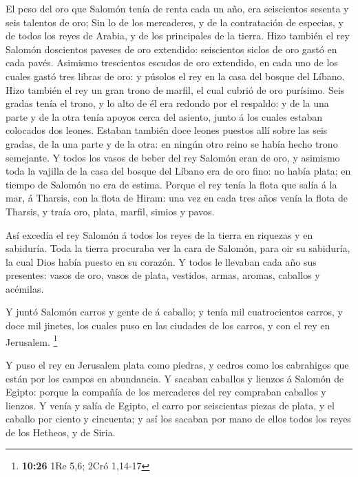  El peso del oro que Salomón tenía de renta cada un año,
era seiscientos sesenta y seis talentos de oro;  Sin lo de
los mercaderes, y de la contratación de especias, y de todos los reyes
de Arabia, y de los principales de la tierra.  Hizo también
el rey Salomón doscientos paveses de oro extendido: seiscientos siclos
de oro gastó en cada pavés.  Asimismo trescientos escudos
de oro extendido, en cada uno de los cuales gastó tres libras de oro: y
púsolos el rey en la casa del bosque del Líbano.  Hizo
también el rey un gran trono de marfil, el cual cubrió de oro purísimo.
 Seis gradas tenía el trono, y lo alto de él era redondo
por el respaldo: y de la una parte y de la otra tenía apoyos cerca del
asiento, junto á los cuales estaban colocados dos leones. 
Estaban también doce leones puestos allí sobre las seis gradas, de la
una parte y de la otra: en ningún otro reino se había hecho trono
semejante.  Y todos los vasos de beber del rey Salomón eran
de oro, y asimismo toda la vajilla de la casa del bosque del Líbano era
de oro fino: no había plata; en tiempo de Salomón no era de estima.
 Porque el rey tenía la flota que salía á la mar, á
Tharsis, con la flota de Hiram: una vez en cada tres años venía la flota
de Tharsis, y traía oro, plata, marfil, simios y pavos.

 Así excedía el rey Salomón á todos los reyes de la tierra
en riquezas y en sabiduría.  Toda la tierra procuraba ver
la cara de Salomón, para oir su sabiduría, la cual Dios había puesto en
su corazón.  Y todos le llevaban cada año sus presentes:
vasos de oro, vasos de plata, vestidos, armas, aromas, caballos y
acémilas.

 Y juntó Salomón carros y gente de á caballo; y tenía mil
cuatrocientos carros, y doce mil jinetes, los cuales puso en las
ciudades de los carros, y con el rey en Jerusalem. \footnote{\textbf{10:26}
  1Re 5,6; 2Cró 1,14-17}

 Y puso el rey en Jerusalem plata como piedras, y cedros
como los cabrahigos que están por los campos en abundancia.
 Y sacaban caballos y lienzos á Salomón de Egipto: porque
la compañía de los mercaderes del rey compraban caballos y lienzos.
 Y venía y salía de Egipto, el carro por seiscientas piezas
de plata, y el caballo por ciento y cincuenta; y así los sacaban por
mano de ellos todos los reyes de los Hetheos, y de Siria.

